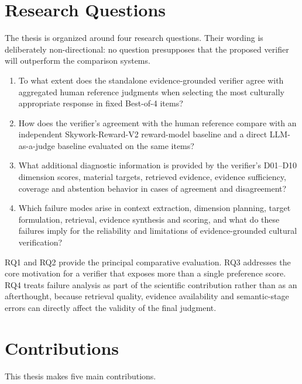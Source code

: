 \section{Research Questions}

The thesis is organized around four research questions. Their wording is deliberately non-directional: no question presupposes that the proposed verifier will outperform the comparison systems.

\begin{enumerate}
    \item[\textbf{RQ1}] To what extent does the standalone evidence-grounded verifier agree with aggregated human reference judgments when selecting the most culturally appropriate response in fixed Best-of-4 items?

    \item[\textbf{RQ2}] How does the verifier's agreement with the human reference compare with an independent Skywork-Reward-V2 reward-model baseline and a direct LLM-as-a-judge baseline evaluated on the same items?

    \item[\textbf{RQ3}] What additional diagnostic information is provided by the verifier's D01--D10 dimension scores, material targets, retrieved evidence, evidence sufficiency, coverage and abstention behavior in cases of agreement and disagreement?

    \item[\textbf{RQ4}] Which failure modes arise in context extraction, dimension planning, target formulation, retrieval, evidence synthesis and scoring, and what do these failures imply for the reliability and limitations of evidence-grounded cultural verification?
\end{enumerate}

RQ1 and RQ2 provide the principal comparative evaluation. RQ3 addresses the core motivation for a verifier that exposes more than a single preference score. RQ4 treats failure analysis as part of the scientific contribution rather than as an afterthought, because retrieval quality, evidence availability and semantic-stage errors can directly affect the validity of the final judgment.

\section{Contributions}

This thesis makes five main contributions.

